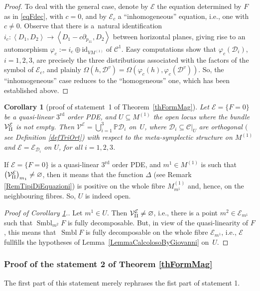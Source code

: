 \documentclass[pdftex]{sigma}
\newcommand{\C}{\mathcal{C}}
\newcommand{\D}{\mathcal{D}}
\newcommand{\M}{\mathcal{V}}
\newcommand{\MMM}{\mathcal{V}_{\textrm{\normalfont II}}}
\newcommand{\E}{\mathcal{E}}
\newcommand{\Span}[1]{\left\langle #1 \right\rangle}
\renewcommand{\P}{\mathbb{P}}
\newcommand{\id}{\mathrm{id}}
\newcommand{\Rd}{^\textrm{rd}}
\numberwithin{equation}{section}
\newtheorem{Corollary}[Theorem]{Corollary}
\begin{document}
\begin{proof}
To deal with the general case, denote by $\E$ the equation determined by $F$ as in \eqref{eqFdec}, with $c=0$, and by $\E_c$ a ``inhomogeneous'' equation, i.e., one with $c\neq 0$. Observe that there is a~natural identif\/ication $i_c\colon \Span{D_1,D_2}\longrightarrow\Span{D_1-c\partial_{p_{11}},D_2}$ between horizontal planes, giving rise to an automorphism $\varphi_c:=i_c\oplus\id_{VM^{(1)}}$ of $\C^1$. Easy computations show that $\varphi_c(\D_i)$, $i=1,2,3$, are precisely the three distributions associated with the factors of the symbol of $\E_c$, and plainly $\Omega(h,\D^v)=\Omega(\varphi_c(h),\varphi_c(\D^v))$. So, the ``inhomogeneous'' case reduces to the ``homogeneous'' one, which has been established above.
\end{proof}

\begin{Corollary}[proof of statement~1 of Theorem~\ref{thFormMag}]\label{corRicettaMagica}
 Let $\E=\{F=0\}$ be a quasi-linear $3\Rd$ order PDE, and $U\subseteq M^{(1)}$ the open
 locus where the bundle $\MMM ^\E$ is not empty. Then
$\M^\E =\bigcup_{i=1}^3\P\D_i$ on~$U$,
 where $\D_i\subseteq\C|_U$ are {orthogonal} $($see Definition {\rm \ref{defTriOrt})} with respect to the meta-symplectic structure on $M^{(1)}$ and $\E=\E_{\D_i}$ on $U$, for all $i=1,2,3$.
\end{Corollary}
If $\E=\{F=0\}$ is a quasi-linear $3\Rd$ order PDE, and $m^1\in M^{(1)}$ is such that $\left(\MMM^\E\right)_{m_1}\neq\varnothing$, then it means that the function $\Delta$ (see Remark \ref{RemTipiDiEquazioni}) is positive on the whole f\/ibre $M^{(1)}_{m^1}$ and, hence, on the neighbouring f\/ibres. So, $U$ is indeed open.
\begin{proof}[Proof of Corollary \ref{corRicettaMagica}.]
 Let $m^1\in U$. Then $\MMM ^\E\neq \varnothing$, i.e., there is a point $m^2\in \E_{m^1}$ such that $\operatorname{Smbl}_{m^2}F$ is fully decomposable. But, in view of the quasi-linearity of $F$, this means that~$\operatorname{Smbl} F$ is fully decomposable on the whole f\/ibre $\E_{m^1}$, i.e., $\E$ fullf\/ills the hypotheses of Lemma~\ref{LemmaCalcolosoByGiovanni} on~$U$.
\end{proof}

\subsubsection{Proof of the statement 2 of Theorem \ref{thFormMag}}\label{SubStat2}

The f\/irst part of this statement merely rephrases the f\/ist part of statement 1.
\end{document}
